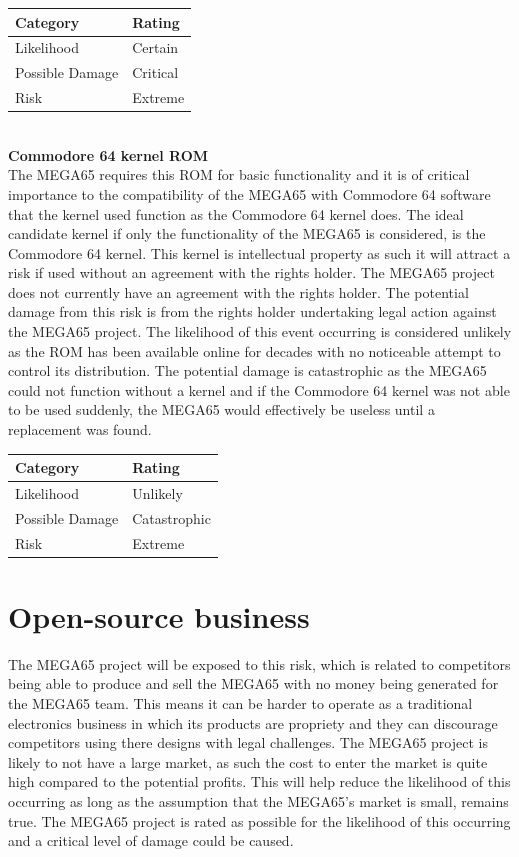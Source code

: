 \begin{tabular}{l|l} %
    	\textbf{Category} 	&	\textbf{Rating} \\
      \hline
     Likelihood			&	Certain \\
     Possible Damage 	& 	Critical \\
     Risk 				&	Extreme		\\	
    \end{tabular} \\


\textbf{Commodore 64 kernel ROM}\\
The MEGA65 requires this ROM for basic functionality and it is of critical importance to the compatibility of the MEGA65 with Commodore 64 software that the kernel used function as the Commodore 64 kernel does. The ideal candidate kernel if only the functionality of the MEGA65 is considered, is the Commodore 64 kernel. This kernel is intellectual property as such it will attract a risk if used without an agreement with the rights holder. The MEGA65 project does not currently have an agreement with the rights holder. The potential damage from this risk is from the rights holder undertaking legal action against the MEGA65 project. The likelihood of this event occurring is considered unlikely as the ROM has been available online for decades with no noticeable attempt to control its distribution. The potential damage is catastrophic as the MEGA65 could not function without a kernel and if the Commodore 64 kernel was not able to be used suddenly, the MEGA65 would effectively be useless until a replacement was found. \\

\begin{tabular}{l|l} %
    	\textbf{Category} 	&	\textbf{Rating} \\
      \hline
     Likelihood			&	Unlikely \\
     Possible Damage 	& 	Catastrophic \\
     Risk 				&	Extreme		\\	
    \end{tabular}


\section{Open-source business}
The MEGA65 project will be exposed to this risk, which is related to competitors being able to produce and sell the MEGA65 with no money being generated for the MEGA65 team. This means it can be harder to operate as a traditional electronics business in which its products are propriety and they can discourage competitors using there designs with legal challenges. The MEGA65 project is likely to not have a large market, as such the cost to enter the market is quite high compared to the potential profits. This will help reduce the likelihood of this occurring as long as the assumption that the MEGA65's market is small, remains true. The MEGA65 project is rated as possible for the likelihood of this occurring and a critical level of damage could be caused. \\

